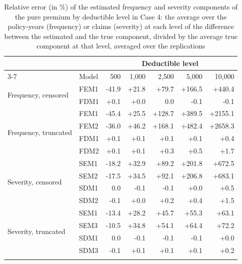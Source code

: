 \documentclass[11pt]{article}
\begin{document}
\begin{table}[!ht]
\footnotesize
\centering
{\color{blue}
\begin{tabular}{llrrrrr}
\toprule
 & & \multicolumn{5}{c}{Deductible level} \\
\cmidrule(lr){3-7}
 & Model &    500 &  1,000 &  2,500 &  5,000 & 10,000 \\
\midrule
\multirow{2}{*}{Frequency, censored} & FEM1 & -41.9 & +21.8 & +79.7 & +166.5 & +440.4 \\
 & FDM1 & +0.1 & +0.0 & 0.0 & -0.1 & -0.1 \\
\midrule
\multirow{4}{*}{Frequency, truncated} & FEM1 & -45.4 & +25.5 & +128.7 & +389.5 & +2155.1 \\
 & FEM2 & -36.0 & +46.2 & +168.1 & +482.4 & +2658.3 \\
 & FDM1 & +0.1 & +0.1 & +0.1 & +0.1 & +0.4 \\
 & FDM2 & +0.1 & +0.1 & +0.3 & +0.5 & +1.7 \\
\midrule
\multirow{4}{*}{Severity, censored} & SEM1 & -18.2 & +32.9 & +89.2 & +201.8 & +672.5 \\
 & SEM2 & -17.5 & +34.5 & +92.1 & +206.8 & +683.1 \\
 & SDM1 & 0.0 & -0.1 & -0.1 & +0.0 & +0.5 \\
 & SDM2 & -0.1 & +0.0 & +0.2 & +0.4 & +1.5 \\
\midrule
\multirow{4}{*}{Severity, truncated} & SEM1 & -13.4 & +28.2 & +45.7 & +55.3 & +63.1 \\
 & SEM3 & -10.5 & +34.8 & +54.1 & +64.4 & +72.2 \\
 & SDM1 & 0.0 & -0.1 & -0.1 & -0.1 & +0.0 \\
 & SDM3 & -0.1 & +0.1 & +0.1 & +0.1 & +0.2 \\
\hhline{=======}
\end{tabular}
}
\caption{Relative error (in \%) of the estimated frequency and severity components of the pure premium by deductible level in Case 4: the average over the policy-years (frequency) or claims (severity) at each level of the difference between the estimated and the true component, divided by the average true component at that level, averaged over the replications}\label{tab:bylevel4}
\end{table}
\end{document}
